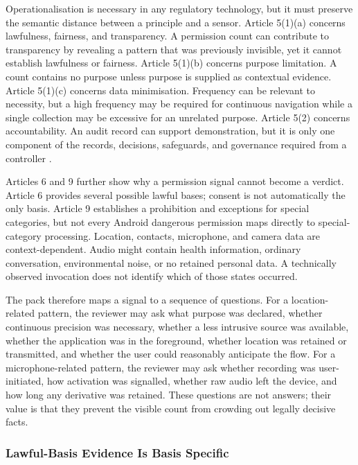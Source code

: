 Operationalisation is necessary in any regulatory technology, but it must preserve the semantic distance between a principle and a sensor. Article 5(1)(a) concerns lawfulness, fairness, and transparency. A permission count can contribute to transparency by revealing a pattern that was previously invisible, yet it cannot establish lawfulness or fairness. Article 5(1)(b) concerns purpose limitation. A count contains no purpose unless purpose is supplied as contextual evidence. Article 5(1)(c) concerns data minimisation. Frequency can be relevant to necessity, but a high frequency may be required for continuous navigation while a single collection may be excessive for an unrelated purpose. Article 5(2) concerns accountability. An audit record can support demonstration, but it is only one component of the records, decisions, safeguards, and governance required from a controller \cite{eurlex2016}.

Articles 6 and 9 further show why a permission signal cannot become a verdict. Article 6 provides several possible lawful bases; consent is not automatically the only basis. Article 9 establishes a prohibition and exceptions for special categories, but not every Android dangerous permission maps directly to special-category processing. Location, contacts, microphone, and camera data are context-dependent. Audio might contain health information, ordinary conversation, environmental noise, or no retained personal data. A technically observed invocation does not identify which of those states occurred.

The pack therefore maps a signal to a sequence of questions. For a location-related pattern, the reviewer may ask what purpose was declared, whether continuous precision was necessary, whether a less intrusive source was available, whether the application was in the foreground, whether location was retained or transmitted, and whether the user could reasonably anticipate the flow. For a microphone-related pattern, the reviewer may ask whether recording was user-initiated, how activation was signalled, whether raw audio left the device, and how long any derivative was retained. These questions are not answers; their value is that they prevent the visible count from crowding out legally decisive facts.

\subsubsection{Lawful-Basis Evidence Is Basis Specific}

